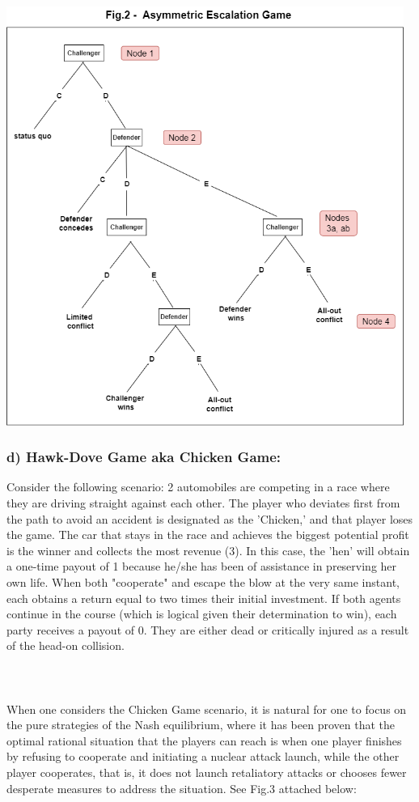 \documentclass[runningheads]{llncs}
\begin{document}
\begin{center}
    \includegraphics[width=13cm]{Asymmetric_escalation_game.png}
\end{center}

\subsubsection{d) Hawk-Dove Game aka Chicken Game:}
Consider the following scenario: 2 automobiles are competing in a race where they are driving straight against each other. The player who deviates first from the path to avoid an accident is designated as the 'Chicken,' and that player loses the game. The car that stays in the race and achieves the biggest potential profit is the winner and collects the most revenue (3). In this case, the 'hen' will obtain a one-time payout of 1 because he/she has been of assistance in preserving her own life. When both "cooperate" and escape the blow at the very same instant, each obtains a return equal to two times their initial investment. If both agents continue in the course (which is logical given their determination to win), each party receives a payout of 0. They are either dead or critically injured as a result of the head-on collision.\\\\\\\\
When one considers the Chicken Game scenario, it is natural for one to focus on the pure strategies of the Nash equilibrium, where it has been proven that the optimal rational situation that the players can reach is when one player finishes by refusing to cooperate and initiating a nuclear attack launch, while the other player cooperates, that is, it does not launch retaliatory attacks or chooses fewer desperate measures to address the situation. See Fig.3 attached below:
\end{document}
